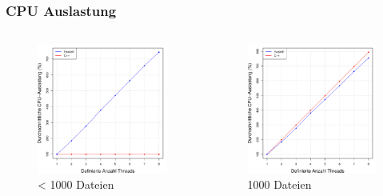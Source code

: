\documentclass[presentation, shownotes]{beamer}
\begin{document}
\begin{frame}
\frametitle{CPU Auslastung}
\begin{columns}[c]
    \begin{figure}
        \includegraphics[width=\textwidth]{cpu_util_sub1000_desktop.pdf}
        \caption{< 1000 Dateien}
    \end{figure}

    \begin{figure}
        \includegraphics[width=\textwidth]{cpu_util_1000_desktop.pdf}
        \caption{1000 Dateien}
    \end{figure}
\end{columns}
\end{frame}
\end{document}

